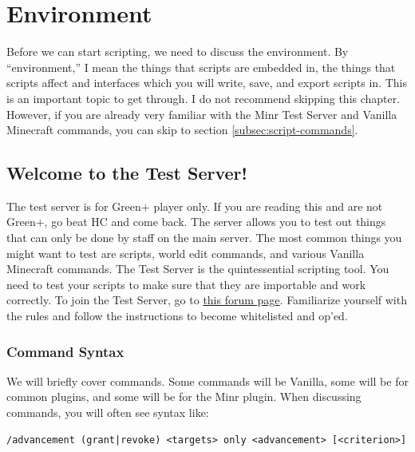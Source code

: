 \documentclass[oneside]{book}
\begin{document}
\hypersetup{linkcolor=black}
\tableofcontents
\hypersetup{linkcolor=blue}

\mainmatter
\pagestyle{plain}

\chapter{Environment}
Before we can start scripting, we need to discuss the environment. By ``environment,'' I mean the things that scripts are embedded in, the things that scripts affect and interfaces which you will write, save, and export scripts in. This is an important topic to get through. I do not recommend skipping this chapter. However, if you are already very familiar with the Minr Test Server and Vanilla Minecraft commands, you can skip to section \ref{subsec:script-commands}.

\section{Welcome to the Test Server!}
The test server is for Green+ player only. If you are reading this and are not Green+, go beat HC and come back. The server allows you to test out things that can only be done by staff on the main server. The most common things you might want to test are scripts, world edit commands, and various Vanilla Minecraft commands. The Test Server is the quintessential scripting tool. You need to test your scripts to make sure that they are importable and work correctly. To join the Test Server, go to \href{https://forums.minr.org/pages/testserver/}{this forum page}. Familiarize yourself with the rules and follow the instructions to become whitelisted and op'ed.

\subsection{Command Syntax}

We will briefly cover commands. Some commands will be Vanilla, some will be for common plugins, and some will be for the Minr plugin. When discussing commands, you will often see syntax like:

\begin{verbatim}
/advancement (grant|revoke) <targets> only <advancement> [<criterion>]
\end{verbatim}
\end{document}
